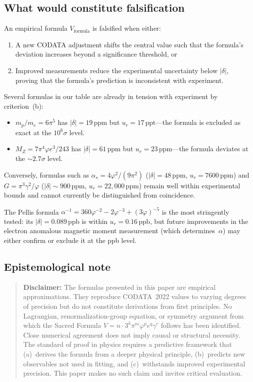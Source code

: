 \documentclass[11pt,a4paper]{article}
\newcommand{\vp}{\varphi}
\newcommand{\ppm}{\,\mathrm{ppm}}
\newcommand{\ppb}{\,\mathrm{ppb}}
\newcommand{\ppt}{\,\mathrm{ppt}}
\begin{document}
\subsection{What would constitute falsification}\label{sec:falsify}

An empirical formula $V_{\mathrm{formula}}$ is falsified when either:
\begin{enumerate}[label=(\alph*)]
\item A new CODATA adjustment shifts the central value such that the formula's
  deviation increases beyond a significance threshold, or
\item Improved measurements reduce the experimental uncertainty below
  $|\delta|$, proving that the formula's prediction is inconsistent with
  experiment.
\end{enumerate}

Several formulas in our table are already in tension with experiment by
criterion~(b):
\begin{itemize}
\item $m_p/m_e = 6\pi^{5}$ has $|\delta|=19\ppm$ but $u_r = 17\ppt$---the
  formula is excluded as exact at the $10^{6}\sigma$ level.
\item $M_Z = 7\pi^{4}\vp e^{3}/243$ has $|\delta|=61\ppm$ but
  $u_r = 23\ppm$---the formula deviates at the $\sim 2.7\sigma$ level.
\end{itemize}

Conversely, formulas such as $\alpha_s = 4\vp^{2}/(9\pi^{2})$
($|\delta|=48\ppm$, $u_r = 7600\ppm$) and $G=\pi^{3}\gamma^{2}/\vp$
($|\delta|\sim 900\ppm$, $u_r = 22{,}000\ppm$) remain well within
experimental bounds and cannot currently be distinguished from
coincidence.

The Pellis formula $\alpha^{-1} = 360\vp^{-2}-2\vp^{-3}+(3\vp)^{-5}$ is
the most stringently tested: its $|\delta|=0.089\ppb$ is within
$u_r = 0.16\ppb$, but future improvements in the electron anomalous magnetic
moment measurement (which determines~$\alpha$) may either confirm or exclude
it at the ppb level.

\subsection*{Epistemological note}

\begin{quote}
\textbf{Disclaimer:} The formulas presented in this paper are empirical
approximations. They reproduce CODATA~2022 values to varying degrees of
precision but do not constitute derivations from first principles. No
Lagrangian, renormalization-group equation, or symmetry argument from which
the Sacred Formula $V = n\cdot 3^{k}\pi^{m}\vp^{p}e^{q}\gamma^{r}$ follows
has been identified. Close numerical agreement does not imply causal or
structural necessity. The standard of proof in physics requires a predictive
framework that (a)~derives the formula from a deeper physical principle,
(b)~predicts new observables not used in fitting, and (c)~withstands improved
experimental precision. This paper makes no such claim and invites critical
evaluation.
\end{quote}
\end{document}
